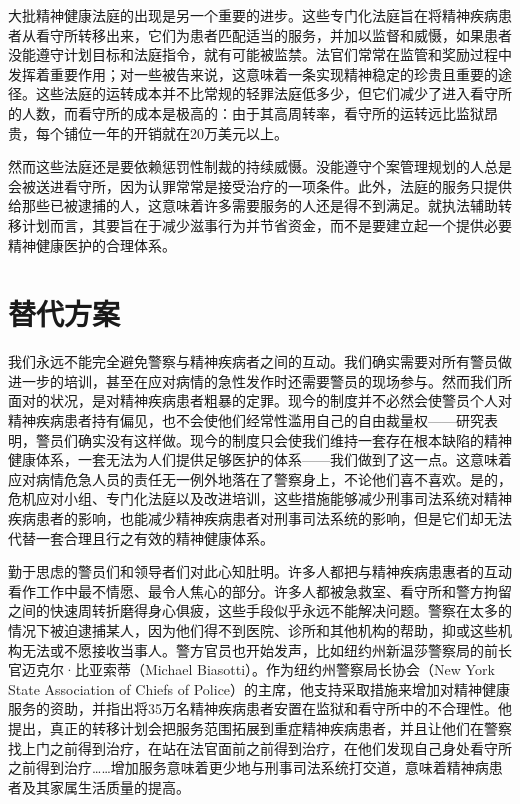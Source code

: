 \documentclass[fontset=fandol, a4paper, 12pt, openright]{ctexbook}
\begin{document}
大批精神健康法庭的出现是另一个重要的进步。这些专门化法庭旨在将精神疾病患者从看守所转移出来，它们为患者匹配适当的服务，并加以监督和威慑，如果患者没能遵守计划目标和法庭指令，就有可能被监禁。法官们常常在监管和奖励过程中发挥着重要作用；对一些被告来说，这意味着一条实现精神稳定的珍贵且重要的途径。这些法庭的运转成本并不比常规的轻罪法庭低多少，但它们减少了进入看守所的人数，而看守所的成本是极高的：由于其高周转率，看守所的运转远比监狱昂贵，每个铺位一年的开销就在20万美元以上。

然而这些法庭还是要依赖惩罚性制裁的持续威慑。没能遵守个案管理规划的人总是会被送进看守所，因为认罪常常是接受治疗的一项条件。此外，法庭的服务只提供给那些已被逮捕的人，这意味着许多需要服务的人还是得不到满足。就执法辅助转移计划而言，其要旨在于减少滋事行为并节省资金，而不是要建立起一个提供必要精神健康医护的合理体系。

\section{替代方案}

我们永远不能完全避免警察与精神疾病者之间的互动。我们确实需要对所有警员做进一步的培训，甚至在应对病情的急性发作时还需要警员的现场参与。然而我们所面对的状况，是对精神疾病患者粗暴的定罪。现今的制度并不必然会使警员个人对精神疾病患者持有偏见，也不会使他们经常性滥用自己的自由裁量权——研究表明，警员们确实没有这样做。现今的制度只会使我们维持一套存在根本缺陷的精神健康体系，一套无法为人们提供足够医护的体系——我们做到了这一点。这意味着应对病情危急人员的责任无一例外地落在了警察身上，不论他们喜不喜欢。是的，危机应对小组、专门化法庭以及改进培训，这些措施能够减少刑事司法系统对精神疾病患者的影响，也能减少精神疾病患者对刑事司法系统的影响，但是它们却无法代替一套合理且行之有效的精神健康体系。

勤于思虑的警员们和领导者们对此心知肚明。许多人都把与精神疾病患惠者的互动看作工作中最不情愿、最令人焦心的部分。许多人都被急救室、看守所和警方拘留之间的快速周转折磨得身心俱疲，这些手段似乎永远不能解决问题。警察在太多的情况下被迫逮捕某人，因为他们得不到医院、诊所和其他机构的帮助，抑或这些机构无法或不愿接收当事人。警方官员也开始发声，比如纽约州新温莎警察局的前长官迈克尔·比亚索蒂（Michael Biasotti）。作为纽约州警察局长协会（New York State Association of Chiefs of Police）的主席，他支持采取措施来增加对精神健康服务的资助，并指出将35万名精神疾病患者安置在监狱和看守所中的不合理性。他提出，真正的转移计划会把服务范围拓展到重症精神疾病患者，并且让他们在警察找上门之前得到治疗，在站在法官面前之前得到治疗，在他们发现自己身处看守所之前得到治疗……增加服务意味着更少地与刑事司法系统打交道，意味着精神病患者及其家属生活质量的提高。
\end{document}

